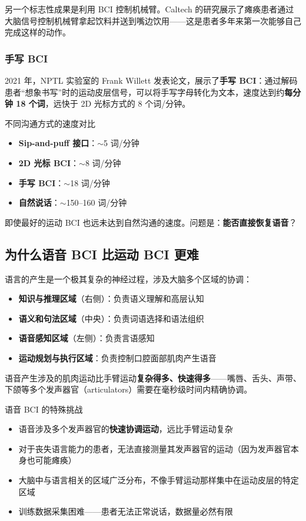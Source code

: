 \documentclass[a4paper]{article}
\begin{document}
另一个标志性成果是利用 BCI 控制机械臂。Caltech 的研究展示了瘫痪患者通过大脑信号控制机械臂拿起饮料并送到嘴边饮用——这是患者多年来第一次能够自己完成这样的动作。

\subsubsection{手写 BCI}

2021 年，NPTL 实验室的 Frank Willett 发表论文，展示了\textbf{手写 BCI}：通过解码患者``想象书写''时的运动皮层信号，可以将手写字母转化为文本，速度达到约\textbf{每分钟 18 个词}，远快于 2D 光标方式的 8 个词/分钟。

\begin{importantbox}{不同沟通方式的速度对比}
\begin{itemize}
    \item \textbf{Sip-and-puff 接口}：$\sim$5 词/分钟
    \item \textbf{2D 光标 BCI}：$\sim$8 词/分钟
    \item \textbf{手写 BCI}：$\sim$18 词/分钟
    \item \textbf{自然说话}：$\sim$150--160 词/分钟
\end{itemize}
即使最好的运动 BCI 也远未达到自然沟通的速度。问题是：\textbf{能否直接恢复语音}？
\end{importantbox}

\subsection{为什么语音 BCI 比运动 BCI 更难}

语言的产生是一个极其复杂的神经过程，涉及大脑多个区域的协调：

\begin{itemize}
    \item \textbf{知识与推理区域}（右侧）：负责语义理解和高层认知
    \item \textbf{语义和句法区域}（中央）：负责词语选择和语法组织
    \item \textbf{语音感知区域}（左侧）：负责言语感知
    \item \textbf{运动规划与执行区域}：负责控制口腔面部肌肉产生语音
\end{itemize}

语音产生涉及的肌肉运动比手臂运动\textbf{复杂得多、快速得多}——嘴唇、舌头、声带、下颌等多个发声器官（articulators）需要在毫秒级时间内精确协调。

\begin{warningbox}{语音 BCI 的特殊挑战}
\begin{itemize}
    \item 语音涉及多个发声器官的\textbf{快速协调运动}，远比手臂运动复杂
    \item 对于丧失语言能力的患者，无法直接测量其发声器官的运动（因为发声器官本身也可能瘫痪）
    \item 大脑中与语言相关的区域广泛分布，不像手臂运动那样集中在运动皮层的特定区域
    \item 训练数据采集困难——患者无法正常说话，数据量必然有限
\end{itemize}
\end{warningbox}
\end{document}
